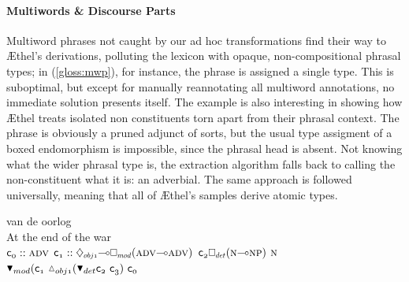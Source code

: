 \paragraph{Multiwords \& Discourse Parts}
Multiword phrases not caught by our ad hoc transformations find their way to \AE thel's derivations, polluting the lexicon with opaque, non-compositional phrasal types;
in (\ref{gloss:mwp}), for instance, the phrase  is assigned a single type.
This is suboptimal, but except for manually reannotating all multiword annotations, no immediate solution presents itself.
The example is also interesting in showing how \AE thel treats isolated non constituents torn apart from their phrasal context.
The phrase is obviously a pruned adjunct of sorts, but the usual type assigment of a boxed endomorphism is impossible, since the phrasal head is absent.
Not knowing what the wider phrasal type is, the extraction algorithm falls back to calling the non-constituent what it is: an adverbial.
The same approach is followed universally, meaning that all of \AE thel's samples derive atomic types.

\begin{exe}
\label{gloss:mwp}
 van de oorlog\\
{At the end} of the war\\
	$\con{0}::\adv[s]$
	$\con{1}::\ddia{obj1}\li\dbox{mod}(\adv[s]\li\adv[s])$
	$\con{2}\dbox{det}(\n[s]\li\np[s])$
	$\n[s]$
\\
{\small
  $\term{
	\dboxelim{mod}(\con{1}~\ddiaintro{obj1}(
		\dboxelim{det}\con{2}~\con{3}
	)
	~\con{0}
  }
  $}
\end{exe}



